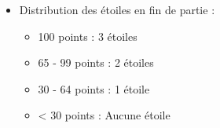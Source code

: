 {\begin{itemize}[label=$\Rightarrow$]
        Pour utiliser cette aide, le joueur doit payer le coût une seule fois. L'aide peut être désactivée et ne nécessitera pas de repayer le coût pour la réactiver. 
        \noexpand\item Distribution des étoiles en fin de partie :
            \noexpand\begin{itemize}
                \noexpand\item 100 points : 3 étoiles
                \noexpand\item 65 - 99 points : 2 étoiles
                \noexpand\item 30 - 64 points : 1 étoile
                \noexpand\item < 30 points : Aucune étoile
            \noexpand\end{itemize}
    \noexpand\end{itemize}
}